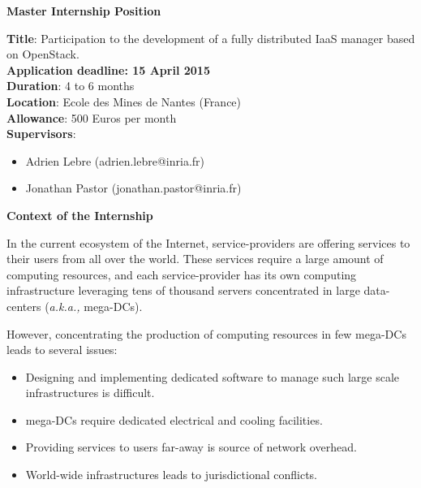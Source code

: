 \documentclass{letter}
\begin{document}
\address{B216 - Ecole des Mines de Nantes\\
4, rue Alfred Kastler, BP 20722\\
44307 Nantes Cedex 3,\\
France}


\begin{letter}
{\Large \textbf{Master Internship Position}}


\date{}

\opening{}

{\textbf{Title}: Participation to the development of a fully distributed
 IaaS manager based on OpenStack.\\
\textbf{Application deadline: 15 April 2015}
\\
\textbf{Duration}: 4 to 6 months\\
\textbf{Location}: Ecole des Mines de Nantes (France)\\
\textbf{Allowance}: 500 Euros per month\\
\textbf{Supervisors}: \begin{itemize}
\item Adrien Lebre (adrien.lebre@inria.fr)
\item Jonathan Pastor (jonathan.pastor@inria.fr)
\end{itemize}
}

{\Large \textbf{Context of the Internship}}

In the current ecosystem of the Internet, service-providers are offering services
to their users from all over the world. These services require
a large amount of computing resources, and each service-provider has its own computing
infrastructure leveraging tens of thousand servers concentrated in large
data-centers (\textit{a.k.a., } mega-DCs).

However, concentrating the production of computing resources in few
mega-DCs  leads to several
issues:

\begin{itemize}
\item  Designing and implementing dedicated software to manage such large scale infrastructures is
difficult.
\item mega-DCs require dedicated electrical and cooling facilities.
\item Providing services to users far-away  is source of network overhead.
\item World-wide infrastructures leads to jurisdictional conflicts.
\end{itemize}


\end{letter}
\end{document}
